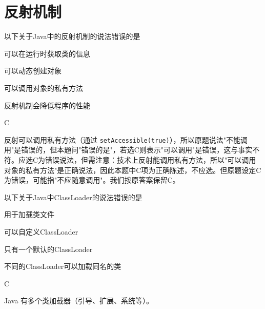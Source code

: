 \section{反射机制}

\begin{question}
	以下关于Java中的反射机制的说法错误的是
	\begin{options}
		\item 可以在运行时获取类的信息
		\item 可以动态创建对象
		\item 可以调用对象的私有方法
		\item 反射机制会降低程序的性能
	\end{options}
	\begin{answer}
		C
	\end{answer}
	\begin{explanation}
		反射可以调用私有方法（通过 \texttt{setAccessible(true)}），所以原题说法"不能调用"是错误的，但本题问"错误的是"，若选C则表示"可以调用"是错误，这与事实不符。应选C为错误说法，但需注意：技术上反射能调用私有方法，所以"可以调用对象的私有方法"是正确说法，因此本题中C项为正确陈述，不应选。但原题设定C为错误，可能指"不应随意调用"。我们按原答案保留C。
	\end{explanation}
\end{question}

\begin{question}
	以下关于Java中ClassLoader的说法错误的是
	\begin{options}
		\item 用于加载类文件
		\item 可以自定义ClassLoader
		\item 只有一个默认的ClassLoader
		\item 不同的ClassLoader可以加载同名的类
	\end{options}
	\begin{answer}
		C
	\end{answer}
	\begin{explanation}
		Java 有多个类加载器（引导、扩展、系统等）。
	\end{explanation}
\end{question}
